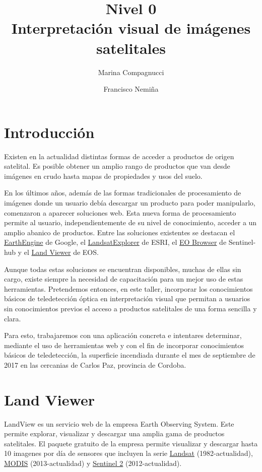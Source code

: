 \documentclass[a4paper,12pt]{book}
\title{{\large Nivel 0} \\ Interpretación visual de imágenes satelitales}
\author{Marina Compagnucci \and Francisco Nemiña}
\begin{document}
\maketitle
\titlepage

\chapter{Introducción}
Existen en la actualidad distintas formas de acceder a productos de origen satelital. Es posible obtener un amplio rango de productos que van desde imágenes en crudo hasta mapas de propiedades y usos del suelo.

En los últimos años, además de las formas tradicionales de procesamiento de imágenes donde un usuario debía descargar un producto para poder manipularlo, comenzaron a aparecer soluciones web. Esta nueva forma de procesamiento permite al usuario, independientemente de su nivel de conocimiento, acceder a un amplio abanico de productos. Entre las soluciones existentes se destacan el \href{https://explorer.earthengine.google.com/#workspace}{EarthEngine} de Google, el \href{http://landsatexplorer.esri.com/}{LandsatExplorer} de ESRI, el \href{http://apps.sentinel-hub.com/eo-browser/}{EO Browser} de Sentinel-hub y el \href{lv.eosda.com}{Land Viewer} de EOS.

Aunque todas estas soluciones se encuentran disponibles, muchas de ellas sin cargo, existe siempre la necesidad de capacitación para un mejor uso de estas herramientas. Pretendemos entonces, en este taller, incorporar los conocimientos básicos de teledetección óptica en interpretación visual que permitan a usuarios sin conocimientos previos el acceso a productos satelitales de una forma sencilla y clara.

Para esto, trabajaremos con una aplicación concreta e intentares determinar, mediante el uso de herramientas web y con el fin de incorporar conocimientos básicos de teledetección, la superficie incendiada durante el mes de septiembre de 2017 en las cercanias de Carlos Paz, provincia de Cordoba.

\chapter{Land Viewer}

LandView es un servicio web de la empresa Earth Observing System. Este permite explorar, visualizar y descargar una amplia gama de productos satelitales. El paquete gratuito de la empresa permite visualizar y descargar hasta 10 imagenes por día de sensores que incluyen la serie \href{https://landsat.usgs.gov/}{Landsat} (1982-actualidad), \href{https://lpdaac.usgs.gov/dataset_discovery/modis/modis_products_table/mcd43a4}{MODIS} (2013-actualidad) y \href{https://sentinel.esa.int/web/sentinel/missions/sentinel-2}{Sentinel 2} (2012-actualidad).
\end{document}

